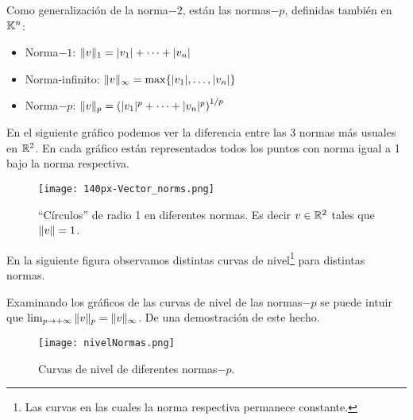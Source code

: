 \tccdefi
Como generalización de la norma$-2$, están las normas$-p$, definidas también en  $\mathbb K^{n}$:

\begin{itemize}
\item Norma$-1$: $\| \vb \|_1 = |v_1| + \dots + |v_n|$
\item Norma-infinito: $\| \vb \|_\infty = \max\{|v_1|, \dots, |v_n|\}$
\item Norma$-p$: $\| \vb \|_p = \left(|v_1|^p  + \dots + |v_n|^p \right)^{1/p}$
\end{itemize}
\etcc

En el siguiente gr\'afico podemos ver la diferencia entre las 3 normas m\'as usuales en $\mathbb R^2$. En cada gr\'afico est\'an representados todos los puntos con norma igual a 1 bajo la norma respectiva.
\clearpage
\begin{figure}
\texttt{[image: 140px-Vector\_norms.png]}
\caption{``Círculos''  de radio 1 en diferentes normas. Es decir $\vb\in \R^2$ tales que $\|\vb\|=1$.}
\end{figure}
En la siguiente figura observamos distintas curvas de nivel\footnote{Las curvas en las cuales la norma respectiva permanece constante.} para distintas normas.
\begin{ejercicio}
 Examinando los gráficos de las curvas de
nivel de las normas$-p$ se puede intuir que  $\lim_{p\to +\infty}\|\vb\|_p=\|\vb\|_\infty$. De una demostración de este hecho.
\end{ejercicio}
\begin{figure}
 \texttt{[image: nivelNormas.png]}
\caption{Curvas de nivel de diferentes normas$-p$.}
\end{figure}
%
